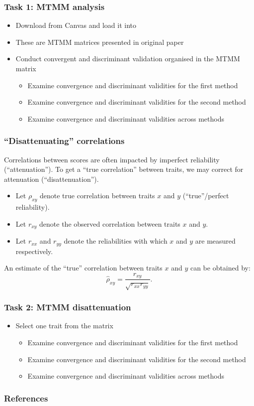 \documentclass[compress,dvipsnames]{beamer}\usepackage[]{graphicx}\usepackage[]{xcolor}
\begin{document}
\begin{frame}[fragile]
	\frametitle{Task 1: MTMM analysis}
		\begin{itemize}
			\item Download  from Canvas and load it into \cR
			\item These are MTMM matrices presented in  original paper
			\item Conduct convergent and discriminant validation organised in the MTMM matrix
				\begin{itemize}
					\item Examine convergence and discriminant validities for the first method
					\item Examine convergence and discriminant validities for the second method
					\item Examine convergence and discriminant validities across methods
				\end{itemize}
		\end{itemize}
\end{frame}


\begin{frame}[fragile]
	\frametitle{``Disattenuating'' correlations}
		Correlations between scores are often impacted by imperfect reliability (``attenuation''). To get a ``true correlation'' between traits, we may correct for attenuation (``disattenuation'').

		\begin{itemize}
			\item Let $\rho_{xy}$ denote true correlation between traits $x$ and $y$ (``true''/perfect reliability).
			\item Let $r_{xy}$ denote the observed correlation between traits $x$ and $y$.
			\item Let $r_{xx}$ and $r_{yy}$ denote the reliabilities with which $x$ and $y$ are measured respectively.
		\end{itemize}

		An estimate of the ``true'' correlation between traits $x$ and $y$ can be obtained by:
		\[ \hat{\rho}_{xy} = \frac{r_{xy}}{\sqrt{r_{xx} r_{yy}}}. \]
\end{frame}


\begin{frame}[fragile]
	\frametitle{Task 2: MTMM disattenuation}
		\begin{itemize}
			\item Select one trait from the  matrix
				\begin{itemize}
					\item Examine convergence and discriminant validities for the first method
					\item Examine convergence and discriminant validities for the second method
					\item Examine convergence and discriminant validities across methods
				\end{itemize}
		\end{itemize}
\end{frame}









\begin{frame}[fragile]
	\frametitle{References}
	\printbibliography
\end{frame}
\end{document}
